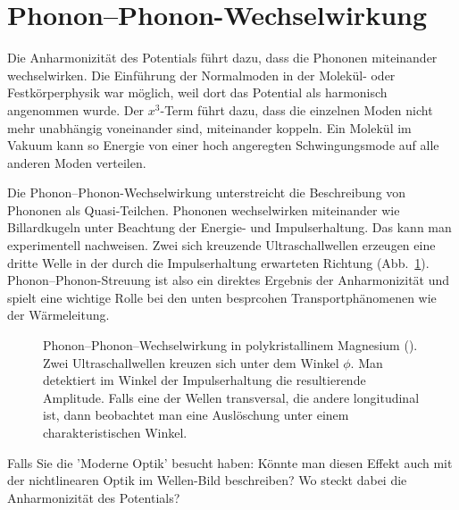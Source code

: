 




\section*{Phonon--Phonon-Wechselwirkung}

Die Anharmonizität des Potentials führt dazu, dass die Phononen miteinander wechselwirken. Die Einführung der Normalmoden in der Molekül- oder Festkörperphysik war möglich, weil dort das Potential als harmonisch angenommen wurde. Der $x^3$-Term führt dazu, dass die einzelnen Moden nicht mehr unabhängig voneinander sind, miteinander koppeln. Ein Molekül im Vakuum kann so Energie von einer hoch angeregten Schwingungsmode auf alle anderen Moden verteilen. 

Die Phonon--Phonon-Wechselwirkung unterstreicht die Beschreibung von Phononen als Quasi-Teilchen. Phononen wechselwirken  miteinander wie Billardkugeln unter Beachtung der Energie- und Impulserhaltung. Das kann man experimentell nachweisen. Zwei sich kreuzende Ultraschallwellen erzeugen eine dritte Welle in der durch die Impulserhaltung erwarteten Richtung (Abb.~\ref{fig:1_US_interaction}).
Phonon--Phonon-Streuung ist also ein direktes Ergebnis der Anharmonizität und spielt eine wichtige Rolle bei den unten besprcohen Transportphänomenen wie der Wärmeleitung.

\begin{figure} 
    
    \caption{Phonon--Phonon--Wechselwirkung in polykristallinem Magnesium (\cite{RollinsJr1964}). Zwei Ultraschallwellen kreuzen sich unter dem Winkel $\phi$. Man detektiert im Winkel der Impulserhaltung die resultierende Amplitude. Falls eine der Wellen transversal, die andere longitudinal ist, dann beobachtet man eine Auslöschung unter einem charakteristischen Winkel. }
    \label{fig:1_US_interaction}
\end{figure}



\begin{questions} 
    \item Falls Sie die 'Moderne Optik' besucht haben: Könnte man diesen Effekt auch mit der nichtlinearen Optik im Wellen-Bild beschreiben? Wo steckt dabei die Anharmonizität des Potentials?
\end{questions}

